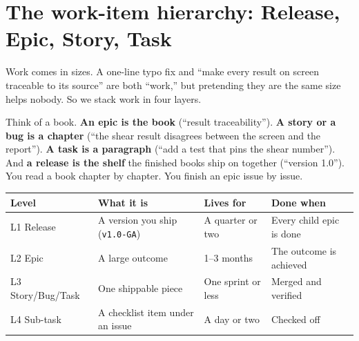 \documentclass[11pt,a4paper]{report}
\newcommand{\code}[1]{\texttt{#1}}
\begin{document}
\section{The work-item hierarchy: Release, Epic, Story, Task}

Work comes in sizes. A one-line typo fix and ``make every result on screen
traceable to its source'' are both ``work,'' but pretending they are the same size
helps nobody. So we stack work in four layers.

\begin{plainenglish}
Think of a book.
\textbf{An epic is the book} (``result traceability'').
\textbf{A story or a bug is a chapter} (``the shear result disagrees between the
screen and the report'').
\textbf{A task is a paragraph} (``add a test that pins the shear number'').
And \textbf{a release is the shelf} the finished books ship on together
(``version 1.0'').
You read a book chapter by chapter. You finish an epic issue by issue.
\end{plainenglish}

\begin{center}
\end{center}

\begin{center}
\begin{tabular}{@{}p{2.3cm}p{4.3cm}p{2.6cm}p{3.2cm}@{}}
\toprule
\textbf{Level} & \textbf{What it is} & \textbf{Lives for} & \textbf{Done when}\\
\midrule
L1 Release & A version you ship (\code{v1.0-GA}) & A quarter or two & Every child epic is done \\
L2 Epic & A large outcome & 1--3 months & The outcome is achieved \\
L3 Story/Bug/Task & One shippable piece & One sprint or less & Merged and verified \\
L4 Sub-task & A checklist item under an issue & A day or two & Checked off \\
\bottomrule
\end{tabular}
\end{center}
\end{document}
